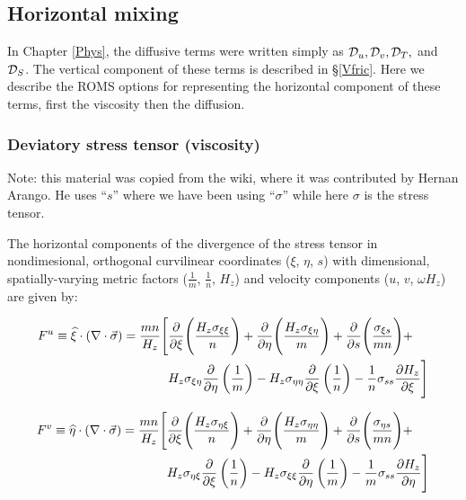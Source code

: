 \subsection{Horizontal mixing}
\label{Smooth}

In Chapter \ref{Phys}, the diffusive terms were written simply as
${\cal D}_u, {\cal D}_v, {\cal D}_T,$ and ${\cal D}_S$.  The vertical
component of these terms is described in \S\ref{Vfric}.  Here we
describe the ROMS options for representing the horizontal
component of these terms, first the viscosity then the diffusion.

\subsubsection{Deviatory stress tensor (viscosity)}

Note: this material was copied from the wiki, where it was
contributed by Hernan Arango. He uses ``$s$'' where we have been using
``$\sigma$'' while here $\sigma$ is the stress tensor.

The horizontal components of the divergence of the stress tensor
\citep{Wajsowicz_93} in
nondimesional, orthogonal curvilinear coordinates ($\xi$, $\eta$,
$s$) with dimensional, spatially-varying metric factors
($\frac{1}{m}$, $\frac{1}{n}$, $H_{z}$) and velocity components
($u$, $v$, $\omega H_{z}$) are given by:

\begin{align}
      F^{u} \equiv
\widehat{\xi}\cdot\left(\nabla\cdot\vec{\sigma}\right) =
          \frac{mn}{H_{z}} \Biggl[ & {\frac{\partial }{\partial \xi}}  \Biggl(
\frac{H_{z}{\sigma}_{\xi\xi}} {n} \Biggr) +
                                     {\frac{\partial }{\partial \eta}} \Biggl(
\frac{H_{z}{\sigma}_{\xi\eta}}{m} \Biggr) +
                                     {\frac{\partial }{\partial s}}    \Biggl(
\frac{{\sigma}_{\xi s}}{mn} \Biggr) + \\
         &H_{z}{\sigma}_{\xi\eta}  {\frac{\partial }{\partial \eta}} \left(
\frac{1}{m}\right) -
          H_{z}{\sigma}_{\eta\eta} {\frac{\partial }{\partial \xi}}  \left(
\frac{1}{n}\right) -
          \frac{1}{n} {\sigma}_{ss}{\frac{\partial H_{z}}{\partial \xi}} \Biggr]
\label{eqstressu}
\end{align}

\begin{align}
      F^{v} \equiv
\widehat{\eta}\cdot\left(\nabla\cdot\vec{\sigma}\right) =
          \frac{mn}{H_{z}} \Biggl[ & {\frac{\partial }{\partial \xi}}  \Biggl(
\frac{H_{z}{\sigma}_{\eta\xi}} {n} \Biggr) +
                                     {\frac{\partial }{\partial \eta}} \Biggl(
\frac{H_{z}{\sigma}_{\eta\eta}}{m} \Biggr) +
                                     {\frac{\partial }{\partial s}}    \Biggl(
\frac{{\sigma}_{\eta s}}{mn} \Biggr) + \\
         &H_{z}{\sigma}_{\eta\xi}  {\frac{\partial }{\partial \xi}}  \left(
\frac{1}{n} \right) -
          H_{z}{\sigma}_{\xi\xi}   {\frac{\partial }{\partial \eta}} \left(
\frac{1}{m} \right) -
          \frac{1}{m}{\sigma}_{ss} {\frac{\partial H_{z}}{\partial \eta}} \Biggr]
\label{eqstressv}
\end{align}

